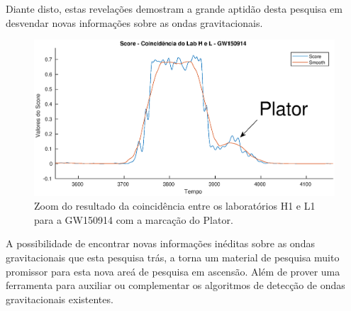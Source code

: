Diante disto, estas revelações demostram a grande aptidão desta pesquisa em desvendar novas informações sobre as ondas gravitacionais.

\begin{figure}[H]
\centering
\includegraphics[width=1\textwidth]{figuras/GW150914_LabHL_plator.eps}
\caption{Zoom do resultado da coincidência entre os laboratórios H1 e L1 para a GW150914 com a marcação do Plator.}
\label{fig:scoreHLPlator}
\end{figure}

A possibilidade de encontrar novas informações inéditas sobre as ondas gravitacionais que esta pesquisa trás, a torna um material de pesquisa muito promissor para esta nova areá de pesquisa em ascensão. Além de prover uma ferramenta para auxiliar ou complementar os algoritmos de detecção de ondas gravitacionais existentes.

